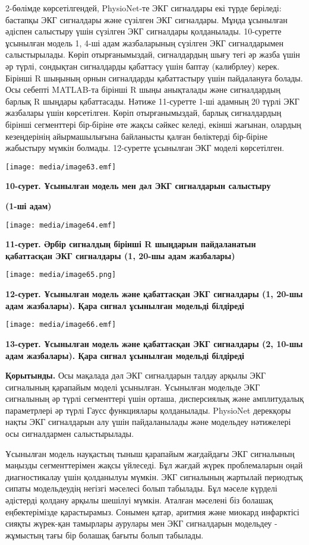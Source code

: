 \documentclass[
]{article}
\begin{document}
2-бөлімде көрсетілгендей, PhysioNet-те ЭКГ сигналдары екі түрде
беріледі: бастапқы ЭКГ сигналдары және сүзілген ЭКГ сигналдары. Мұнда
ұсынылған әдіспен салыстыру үшін сүзілген ЭКГ сигналдары қолданылады.
10-суретте ұсынылған модель 1, 4-ші адам жазбаларының сүзілген ЭКГ
сигналдарымен салыстырылады. Көріп отырғанымыздай, сигналдардың шығу
тегі әр жазба үшін әр түрлі, сондықтан сигналдарды қабаттасу үшін баптау
(калибрлеу) керек. Бірінші R шыңының орнын сигналдарды қабаттастыру үшін
пайдалануға болады. Осы себепті MATLAB-та бірінші R шыңы анықталады және
сигналдардың барлық R шыңдары қабаттасады. Нәтиже 11-суретте 1-ші
адамның 20 түрлі ЭКГ жазбалары үшін көрсетілген. Көріп отырғанымыздай,
барлық сигналдардың бірінші сегменттері бір-біріне өте жақсы сәйкес
келеді, екінші жағынан, олардың кезеңдерінің айырмашылығына байланысты
қалған бөліктерді бір-біріне жабыстыру мүмкін болмады. 12-суретте
ұсынылған ЭКГ моделі көрсетілген.

\texttt{[image: media/image63.emf]}

\textbf{10-сурет. Ұсынылған модель мен дәл ЭКГ сигналдарын салыстыру}

\textbf{(1-ші адам)}

\texttt{[image: media/image64.emf]}

\textbf{11-сурет. Әрбір сигналдың бірінші R шыңдарын пайдаланатын
қабаттасқан ЭКГ сигналдары (1, 20-шы адам жазбалары)}

\texttt{[image: media/image65.png]}

\textbf{12-сурет. Ұсынылған модель және қабаттасқан ЭКГ сигналдары (1,
20-шы адам жазбалары). Қара сигнал ұсынылған модельді білдіреді}

\texttt{[image: media/image66.emf]}

\textbf{13-сурет. Ұсынылған модель және қабаттасқан ЭКГ сигналдары (2,
10-шы адам жазбалары). Қара сигнал ұсынылған модельді білдіреді}

\textbf{Қорытынды.} Осы мақалада дәл ЭКГ сигналдарын талдау арқылы ЭКГ
сигналының қарапайым моделі ұсынылған. Ұсынылған модельде ЭКГ сигналының
әр түрлі сегменттері үшін орташа, дисперсиялық және амплитудалық
параметрлері әр түрлі Гаусс функциялары қолданылады. PhysioNet дерекқоры
нақты ЭКГ сигналдарын алу үшін пайдаланылады және модельдеу нәтижелері
осы сигналдармен салыстырылады.

Ұсынылған модель науқастың тыныш қарапайым жағдайдағы ЭКГ сигналының
маңызды сегменттерімен жақсы үйлеседі. Бұл жағдай жүрек проблемаларын
оңай диагностикалау үшін қолданылуы мүмкін. ЭКГ сигналының жартылай
периодтық сипаты модельдеудің негізгі мәселесі болып табылады. Бұл
мәселе күрделі әдістерді қолдану арқылы шешілуі мүмкін. Аталған мәселені
біз болашақ еңбектерімізде қарастырамыз. Сонымен қатар, аритмия және
миокард инфарктісі сияқты жүрек-қан тамырлары аурулары мен ЭКГ
сигналдарын модельдеу - жұмыстың тағы бір болашақ бағыты болып табылады.
\end{document}
